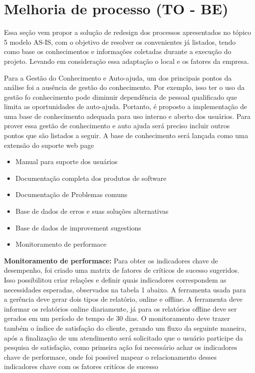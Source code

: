 \section{ Melhoria de processo (TO - BE)}

Essa seção vem  propor a solução de redesign  dos processos
apresentados no tópico 5 modelo AS-IS, com o objetivo de resolver os convenientes
já listados, tendo como base os conhecimentos e informações coletadas
durante a execução do projeto. Levando em consideração essa adaptação o
local e os fatores da empresa.

Para a Gestão do Conhecimento e Auto-ajuda, um dos principais pontos da
análise foi a ausência de gestão do conhecimento. Por exemplo, isso ter o
uso da gestão fo conhecimento pode diminuir dependência de
pessoal qualificado que limita as oportunidades de auto-ajuda.
Portanto, é proposto a implementação de  uma base de conhecimento adequada
para uso interno e aberto dos usuários. Para prover essa gestão de conhecimento
e auto ajuda será preciso incluir outros pontos que são listados a seguir.
A base de conhecimento será lançada como uma extensão do suporte web page


\begin{itemize}[noitemsep]

		\item Manual para suporte dos usuários
		\item Documentação completa dos produtos de software
		\item Documentação de Problemas comuns
		\item Base de dados de erros e suas soluções alternativas
		\item Base de dados de improvement sugestions
		\item Monitoramento de performace \\

\end{itemize}

 \textbf{Monitoramento de performace:}
Para obter os indicadores chave de desempenho, foi criado uma
matrix de fatores de críticos de sucesso sugeridos.
Isso possibilitou criar relações e definir quais indicadores
correspondem as necessidades esperadas, observados na tabela 1 abaixo.
	A ferramenta usada para a gerência deve gerar dois tipos de relatório, online
	e offline. A ferramenta deve informar os relatórios online diariamente, já
	para os relatórios offline deve ser gerados em um período de tempo de 30 dias.
	O monitoramento deve trazer também o índice de satisfação do cliente,
	gerando um fluxo da seguinte maneira, após a finalização de um atendimento
	será solicitado que o usuário participe da pesquisa de satisfação, como
	primeira ação foi necessário achar os indicadores chave de performace,
	onde foi possivel mapear o relacionamento desses indicadores chave com os fatores
	critícos de sucesso

